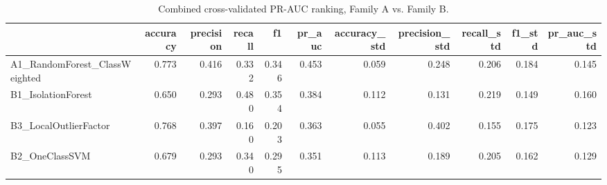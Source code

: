 \begin{table}[htbp]
\caption{Combined cross-validated PR-AUC ranking, Family A vs. Family B.}
\label{tab:combined_family_summary}
\begin{tabular}{lrrrrrrrrrr}
\toprule
 & accuracy & precision & recall & f1 & pr\_auc & accuracy\_std & precision\_std & recall\_std & f1\_std & pr\_auc\_std \\
\midrule
A1\_RandomForest\_ClassWeighted & 0.773 & 0.416 & 0.332 & 0.346 & 0.453 & 0.059 & 0.248 & 0.206 & 0.184 & 0.145 \\
B1\_IsolationForest & 0.650 & 0.293 & 0.480 & 0.354 & 0.384 & 0.112 & 0.131 & 0.219 & 0.149 & 0.160 \\
B3\_LocalOutlierFactor & 0.768 & 0.397 & 0.160 & 0.203 & 0.363 & 0.055 & 0.402 & 0.155 & 0.175 & 0.123 \\
B2\_OneClassSVM & 0.679 & 0.293 & 0.340 & 0.295 & 0.351 & 0.113 & 0.189 & 0.205 & 0.162 & 0.129 \\
\bottomrule
\end{tabular}
\end{table}
